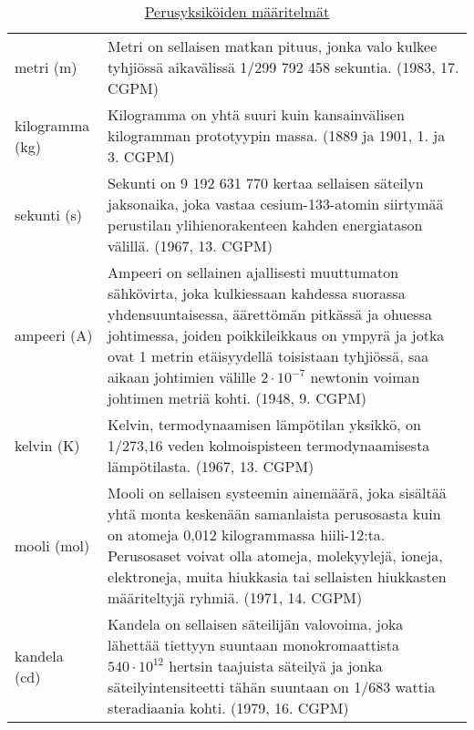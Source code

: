 \begin{table}[ht!]
\centering
\setlength{\extrarowheight}{5pt}
\caption{\href{https://en.wikipedia.org/wiki/SI_base_unit}{Perusyksiköiden määritelmät} \cite[s. 64-65]{MAOL} }
\begin{tabularx}{\textwidth}{lX}
\hline
metri (m)		& Metri on sellaisen matkan pituus, jonka valo kulkee tyhjiössä aikavälissä 1/299 792 458 sekuntia. \newline (1983, 17. CGPM) \\

kilogramma (kg)	& Kilogramma on yhtä suuri kuin kansainvälisen kilogramman prototyypin massa. \newline (1889 ja 1901, 1. ja 3. CGPM) \\

sekunti (s)		& Sekunti on 9 192 631 770 kertaa sellaisen säteilyn jaksonaika, joka vastaa cesium-133-atomin siirtymää perustilan ylihienorakenteen kahden energiatason välillä. \newline (1967, 13. CGPM) \\

ampeeri (A)		& Ampeeri on sellainen ajallisesti muuttumaton sähkövirta, joka kulkiessaan kahdessa suorassa yhdensuuntaisessa, äärettömän pitkässä ja ohuessa johtimessa, joiden poikkileikkaus on ympyrä ja jotka ovat 1 metrin etäisyydellä toisistaan tyhjiössä, saa aikaan johtimien välille $2 \cdot 10^{-7}$ newtonin voiman johtimen metriä kohti. \newline (1948, 9. CGPM) \\

kelvin (K)		& Kelvin, termodynaamisen lämpötilan yksikkö, on 1/273,16 veden kolmoispisteen termodynaamisesta lämpötilasta. \newline (1967, 13. CGPM) \\

mooli (mol)		& Mooli on sellaisen systeemin ainemäärä, joka sisältää yhtä monta keskenään samanlaista perusosasta kuin on atomeja 0,012 kilogrammassa hiili-12:ta. Perusosaset voivat olla atomeja, molekyylejä, ioneja, elektroneja, muita hiukkasia tai sellaisten hiukkasten määriteltyjä ryhmiä. \newline (1971, 14. CGPM) \\

kandela (cd)	& Kandela on sellaisen säteilijän valovoima, joka lähettää tiettyyn suuntaan monokromaattista $540 \cdot 10^{12}$ hertsin taajuista säteilyä ja jonka säteilyintensiteetti tähän suuntaan on 1/683 wattia steradiaania kohti. \newline (1979, 16. CGPM) \\
\end{tabularx}

\end{table}


